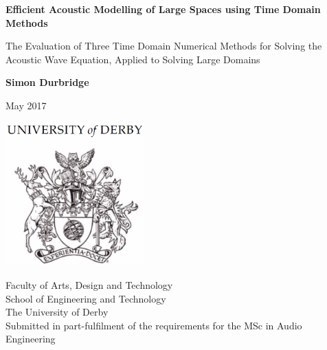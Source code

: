 

\begin{titlepage}
    \begin{center}
        \vspace*{1cm}
        
        \textbf{Efficient Acoustic Modelling of Large Spaces using Time Domain Methods}
        
        \vspace{0.5cm}
        The Evaluation of Three Time Domain Numerical Methods for Solving the Acoustic Wave Equation, Applied to Solving Large Domains
        
        \vspace{1.5cm}
        
        \textbf{Simon Durbridge}
        
        \vspace{1.5cm}
        May 2017
        
        \vspace{1.5 cm}
        
        \includegraphics[width=0.4\textwidth]{./graphics/unicrest.png}
        
        Faculty of Arts, Design and Technology\\
        School of Engineering and Technology\\
        The University of Derby\\
        

    \vfill
    Submitted in part-fulfilment of the requirements for the MSc in Audio Engineering
        \end{center}
\end{titlepage}